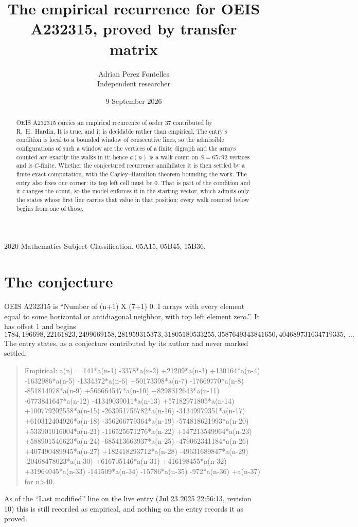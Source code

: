 \documentclass[11pt,a4paper]{article}
\title{The empirical recurrence for OEIS A232315, proved by transfer matrix}
\author{Adrian Perez Fontelles\\ \small Independent researcher}
\date{9 September 2026}
\theoremstyle{plain}
\theoremstyle{definition}
\begin{document}
\maketitle

\begin{abstract}
OEIS A232315 carries an empirical recurrence of order $37$ contributed by R.~H.~Hardin. It is
true, and it is decidable rather than empirical. The entry's condition is local to a bounded window of consecutive lines, so
the admissible configurations of such a window are the vertices of a finite digraph and the
arrays counted are exactly the walks in it; hence $a(n)$ is a walk count on $S=65792$ vertices
and is $C$-finite. Whether the conjectured recurrence annihilates it is then settled by a
finite exact computation, with the Cayley--Hamilton theorem bounding the work.
 The entry also fixes one corner: its top left cell must be $0$. That is part of the condition and it changes the count, so the model enforces it in the starting vector, which admits only the states whose first line carries that value in that position; every walk counted below begins from one of those.\end{abstract}

\noindent\small 2020 Mathematics Subject Classification. 05A15, 05B45, 15B36.\normalsize

\section{The conjecture}

OEIS A232315 is ``Number of (n+1) X (7+1) 0..1 arrays with every element equal to some horizontal or antidiagonal neighbor, with top left element zero.''. It has offset $1$ and begins
\[
1784, 196698, 22161823, 2499669158, 281959315373, 31805180533255, 3587649343841650, 404689731634719335,\ \dots
\]
The entry states, as a conjecture contributed by its author and never marked settled:
\begin{quote}
Empirical: a(n) = 141*a(n-1) -3378*a(n-2) +21209*a(n-3) +130164*a(n-4) -1632986*a(n-5) -1334372*a(n-6) +50173398*a(n-7) -17669770*a(n-8) -851814078*a(n-9) +566664547*a(n-10) +8298312643*a(n-11) -6773841647*a(n-12) -41349039011*a(n-13) +57182971805*a(n-14) +100779202558*a(n-15) -263951756782*a(n-16) -31349979351*a(n-17) +610312404926*a(n-18) -356266779364*a(n-19) -574818621993*a(n-20) +533901016004*a(n-21) -116525671276*a(n-22) +147213549964*a(n-23) +588901546623*a(n-24) -685413663937*a(n-25) -479062341184*a(n-26) +407490489945*a(n-27) +182418293712*a(n-28) -49631689847*a(n-29) -20468478023*a(n-30) +616705146*a(n-31) +416198455*a(n-32) +31964045*a(n-33) -141509*a(n-34) -15786*a(n-35) -972*a(n-36) +a(n-37) for n>40.
\end{quote}
As of the ``Last modified'' line on the live entry (Jul 23 2025 22:56:13, revision 10) this is still
recorded as empirical, and nothing on the entry records it as proved.
\end{document}
